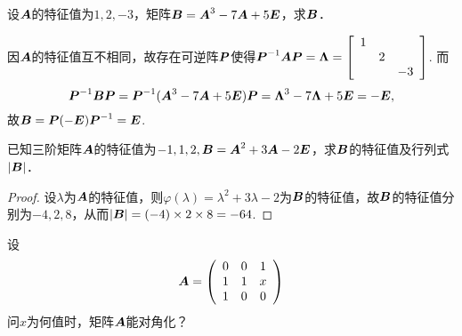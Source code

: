 \begin{frame}
  \begin{li}[\red{$\bigstar$}]
    设$\A$的特征值为$1,2,-3$，矩阵$\B=\A^3-7\A+5\E$，求$\B$．
  \end{li} \pause
  \begin{jie}
    因$\A$的特征值互不相同，故存在可逆阵$\PP$使得$\PP^{-1}\A\PP=\Lambdabd=\left[
      \begin{array}{rrr}
        1&&\\
        &2&\\
        &&-3
      \end{array}
    \right]$. 而
    $$
    \PP^{-1}\B\PP=\PP^{-1}(\A^3-7\A+5\E)\PP=\Lambdabd^3-7\Lambdabd+5\E=-\E,
    $$
    故$\B=\PP(-\E)\PP^{-1}=\E$.
  \end{jie}
\end{frame}

\begin{frame}
  \begin{li}[\red{$\bigstar$}]
    已知三阶矩阵$\A$的特征值为$-1,1,2, \B=\A^2+3\A-2\E$，求$\B$的特征值及行列式$|\B|$．
  \end{li} \pause
  \begin{proof}
    设$\lambda$为$\A$的特征值，则$\varphi(\lambda)=\lambda^2+3\lambda-2$为$\B$的特征值，故$\B$的特征值分别为$-4,2,8$，从而$|\B|=(-4)\times2\times8=-64$.
  \end{proof}
\end{frame}

\begin{frame}[fragile]\ft{\subsecname}
\begin{li}
  设
  $$
  \A=\left(
    \begin{array}{ccc}
      0&0&1\\
      1&1&x\\
      1&0&0
    \end{array}
  \right)
  $$
  问$x$为何值时，矩阵$\A$能对角化？
\end{li}
\end{frame}

